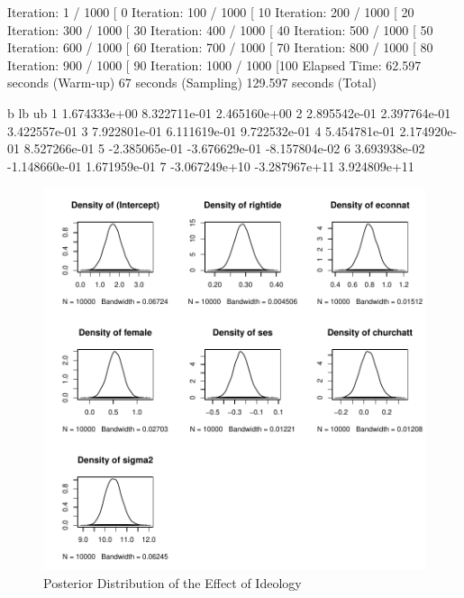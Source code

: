 \documentclass[12pt]{article}
\begin{document}
\begin{enumerate}
\begin{Schunk}
\begin{Soutput}
Iteration:   1 / 1000 [  0%
Iteration: 100 / 1000 [ 10%
Iteration: 200 / 1000 [ 20%
Iteration: 300 / 1000 [ 30%
Iteration: 400 / 1000 [ 40%
Iteration: 500 / 1000 [ 50%
Iteration: 600 / 1000 [ 60%
Iteration: 700 / 1000 [ 70%
Iteration: 800 / 1000 [ 80%
Iteration: 900 / 1000 [ 90%
Iteration: 1000 / 1000 [100%
Elapsed Time: 62.597 seconds (Warm-up)
              67 seconds (Sampling)
              129.597 seconds (Total)
\end{Soutput}
\begin{Soutput}
              b            lb            ub
1  1.674333e+00  8.322711e-01  2.465160e+00
2  2.895542e-01  2.397764e-01  3.422557e-01
3  7.922801e-01  6.111619e-01  9.722532e-01
4  5.454781e-01  2.174920e-01  8.527266e-01
5 -2.385065e-01 -3.676629e-01 -8.157804e-02
6  3.693938e-02 -1.148660e-01  1.671959e-01
7 -3.067249e+10 -3.287967e+11  3.924809e+11
\end{Soutput}
\end{Schunk}

\begin{figure}[htbp] 
  \caption{Posterior Distribution of the Effect of Ideology}
  \label{F:postide}
  \begin{center}
    \includegraphics[width=5.25in]{PS3-f1.pdf}
  \end{center}
\end{figure}


\end{enumerate}
\end{document}
